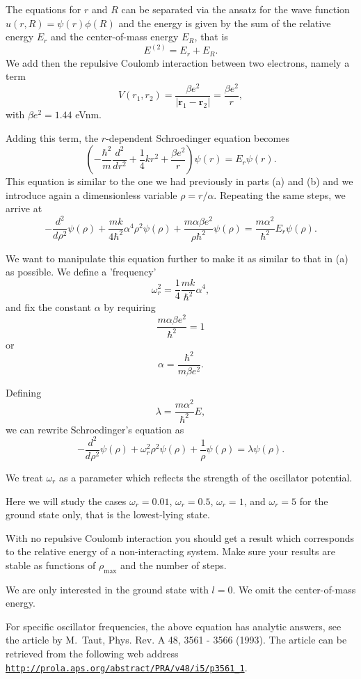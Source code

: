 \documentclass[%
oneside,                 %
final,                   %
10pt]{article}
\begin{document}
The equations for $r$ and $R$ can be separated via the ansatz for the 
wave function $u(r,R) = \psi(r)\phi(R)$ and the energy is given by the sum
of the relative energy $E_r$ and the center-of-mass energy $E_R$, that
is
\[
E^{(2)}=E_r+E_R.
\]
We add then the repulsive Coulomb interaction between two electrons,
namely a term 
\[
V(r_1,r_2) = \frac{\beta e^2}{|\mathbf{r}_1-\mathbf{r}_2|}=\frac{\beta e^2}{r},
\]
with $\beta e^2=1.44$ eVnm.

Adding this term, the $r$-dependent Schroedinger equation becomes
\[
\left(  -\frac{\hbar^2}{m} \frac{d^2}{dr^2}+ \frac{1}{4}k r^2+\frac{\beta e^2}{r}\right)\psi(r)  = E_r \psi(r).
\]
This equation is similar to the one we had previously in parts (a) and (b) 
and we introduce
again a dimensionless variable $\rho = r/\alpha$. Repeating the same
steps, we arrive at 
\[
  -\frac{d^2}{d\rho^2} \psi(\rho) 
       + \frac{mk}{4\hbar^2} \alpha^4\rho^2\psi(\rho)+\frac{m\alpha \beta e^2}{\rho\hbar^2}\psi(\rho)  = 
\frac{m\alpha^2}{\hbar^2}E_r \psi(\rho) .
\]

We want to manipulate this equation further to make it as similar to that in (a)
as possible. We define a 'frequency' 
\[
\omega_r^2=\frac{1}{4}\frac{mk}{\hbar^2} \alpha^4,
\]
and fix the constant $\alpha$ by requiring 
\[
\frac{m\alpha \beta e^2}{\hbar^2}=1
\]
or 
\[
\alpha = \frac{\hbar^2}{m\beta e^2}.
\]

Defining 
\[
\lambda = \frac{m\alpha^2}{\hbar^2}E,
\]
we can rewrite Schroedinger's equation as
\[
  -\frac{d^2}{d\rho^2} \psi(\rho) + \omega_r^2\rho^2\psi(\rho) +\frac{1}{\rho}\psi(\rho) = \lambda \psi(\rho).
\]

We treat $\omega_r$ as a parameter which reflects the strength of the oscillator potential.

Here we will study the cases $\omega_r = 0.01$, $\omega_r = 0.5$, $\omega_r =1$,
and $\omega_r = 5$   
for the ground state only, that is the lowest-lying state.

With no repulsive Coulomb interaction 
you should get a result which corresponds to 
the relative energy of a non-interacting system.   
Make sure your results are 
stable as functions of $\rho_{\mathrm{max}}$ and the number of steps.

We are only interested in the ground state with $l=0$. We omit the 
center-of-mass energy.

For specific oscillator frequencies, the above equation has analytic answers,
see the article by M.~Taut, Phys. Rev. A 48, 3561 - 3566 (1993).
The article can be retrieved from the following web address \href{{http://prola.aps.org/abstract/PRA/v48/i5/p3561_1}}{\nolinkurl{http://prola.aps.org/abstract/PRA/v48/i5/p3561_1}}.
\end{document}
